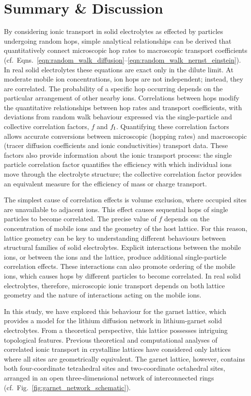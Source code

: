 \documentclass[aps,prb,twocolumn,superscriptaddress,reprint]{revtex4-1}
\begin{document}
\section{Summary \& Discussion}

By considering ionic transport in solid electrolytes as effected by particles undergoing random hops, simple analytical relationships can be derived that quantitatively connect microscopic hop rates to macroscopic transport coefficients (cf.\ Eqns.~\ref{eqn:random_walk_diffusion}--\ref{eqn:random_walk_nernst_einstein}). In real solid electrolytes these equations are exact only in the dilute limit. At moderate mobile ion concentrations, ion hops are not independent; 
instead, they are correlated. The probability of a specific hop occurring depends on the particular arrangement of other nearby ions. Correlations between hops modify the quantitative relationships between hop rates and transport coefficients, with deviations from random walk behaviour expressed via the single-particle and collective correlation factors, $f$ and $f_{\mathrm{I}}$. Quantifying these correlation factors allows accurate conversions between microscopic (hopping rates) and macroscopic (tracer diffusion coefficients and ionic conductivities) transport data. These factors also provide information about the ionic transport process: the single particle correlation factor quantifies the efficiency with which individual ions move through the electrolyte structure; the collective correlation factor provides an equivalent measure for the efficiency of mass or charge transport.

The simplest cause of correlation effects is volume exclusion, where occupied sites are unavailable to adjacent ions. This effect causes sequential hops of single particles to become correlated. The precise value of $f$ depends on the concentration of mobile ions and the geometry of the host lattice. For this reason, lattice geometry can be key to understanding different behaviours between structural families of solid electrolytes. Explicit interactions between the mobile ions, or between the ions and the lattice, produce additional single-particle correlation effects. These interactions can also promote ordering of the mobile ions, which causes hops by different particles to become correlated. In real solid electrolytes, therefore, microscopic ionic transport depends on both lattice geometry and the nature of interactions acting on the mobile ions.

In this study, we have explored this behaviour for the garnet lattice, which provides a model for the lithium diffusion network in lithium-garnet solid electrolytes. From a theoretical perspective, this lattice possesses intriguing topological features. Previous theoretical and computational analyses of correlated ionic transport in crystalline lattices have considered only lattices where all sites are geometrically equivalent. The garnet lattice, however, contains both four-coordinate tetrahedral sites and two-coordinate octahedral sites, arranged in an open three-dimensional network of interconnected rings (cf.\ Fig.~\ref{fig:garnet_network_schematic}). 
\end{document}
